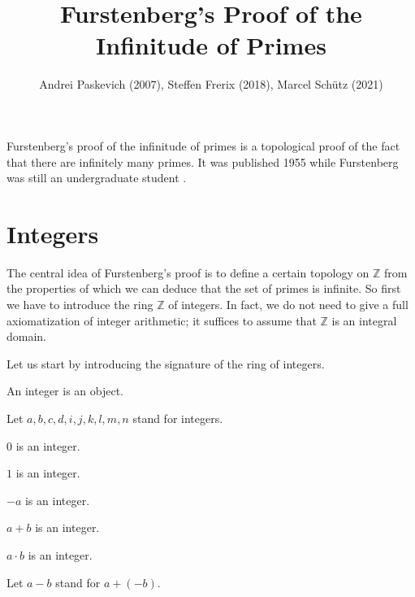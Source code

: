 \documentclass{article}
\title{Furstenberg's Proof of the Infinitude of Primes}
\author{Andrei Paskevich (2007), Steffen Frerix (2018), Marcel Schütz (2021)}
\date{}
\newcommand{\Int}{\mathbb{Z}}
\begin{document}
  \maketitle

  \noindent
  Furstenberg's proof of the infinitude of primes is a topological proof of the fact that there are
  infinitely many primes. It was published 1955 while Furstenberg was still an undergraduate
  student \cite{Furstenberg1955}.

  \section{Integers}

  The central idea of Furstenberg's proof is to define a certain topology on $\Int$ from the
  properties of which we can deduce that the set of primes is infinite. So first we have to
  introduce the ring $\Int$ of integers. In fact, we do not need to give a full axiomatization of
  integer arithmetic; it suffices to assume that $\Int$ is an integral domain.

  Let us start by introducing the signature of the ring of integers.

  \begin{forthel}

    \begin{signature}\label{Integers}
      An integer is an object.
    \end{signature}

    Let $a,b,c,d,i,j,k,l,m,n$ stand for integers.

    \begin{signature}\label{IntZero}
      $0$ is an integer.
    \end{signature}

    \begin{signature}\label{IntOne}
      $1$ is an integer.
    \end{signature}

    \begin{signature}\label{IntNeg}
      $-a$ is an integer.
    \end{signature}

    \begin{signature}\label{IntPlus}
      $a + b$ is an integer.
    \end{signature}

    \begin{signature}\label{IntMult}
      $a \cdot b$ is an integer.
    \end{signature}

    Let $a - b$ stand for $a + (-b)$.
  \end{forthel}
\end{document}
